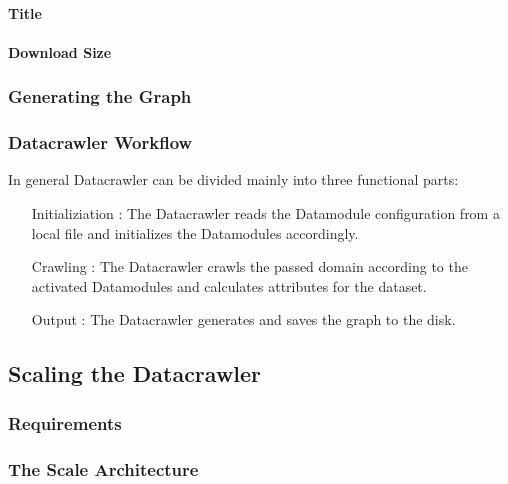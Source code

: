 \paragraph{Title}

\paragraph{Download Size}

\subsubsection{Generating the Graph}
\label{datacrawler_graph}
\subsubsection{Datacrawler Workflow}
\label{datacrawler_workflow}

In general Datacrawler can be divided mainly into three functional parts:

\begin{enumerate}
	\item[Initializiation] : The Datacrawler reads the Datamodule configuration from a local file and initializes the Datamodules accordingly.
	\item[Crawling] : The Datacrawler crawls the passed domain according to the activated Datamodules and calculates attributes for the dataset.
	\item[Output] : The Datacrawler generates and saves the graph to the disk.
\end{enumerate}


\subsection{Scaling the Datacrawler}
\label{datacrawler_scale}

\subsubsection{Requirements}
\label{datacrawler_scale_requirements}

\subsubsection{The Scale Architecture}
\label{datacrawler_scale_architecture}


